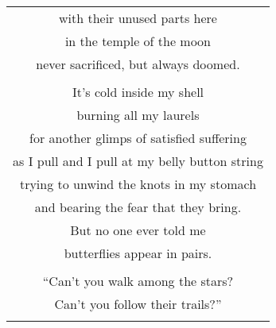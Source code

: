 \documentclass{article}
\begin{document}
\begin{center}
\begin{tabular}{c}
with their unused parts here \\
in the temple of the moon \\
never sacrificed, but always doomed. \\
\\
It's cold inside my shell \\
burning all my laurels \\
for another glimps of satisfied suffering \\
as I pull and I pull at my belly button string \\
trying to unwind the knots in my stomach \\
and bearing the fear that they bring. \\
But no one ever told me \\
butterflies appear in pairs. \\
\\
``Can't you walk among the stars? \\
Can't you follow their trails?'' \\
\\
\end{tabular}
\end{center}
\end{document}
